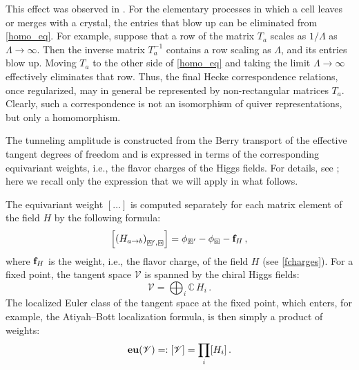 \documentclass[10pt]{article}
\theoremstyle{definition}
\def\IC{\mathbb{C}}
\def\sV{{\mathscr{V}}}
\def\lm{\limits}
\numberwithin{equation}{section}
\newcommand\ssqbox[1]{{
		\setbox0=\hbox{\mbox{$\scriptstyle\Box$}}
		\setbox1=\hbox{\mbox{\raisebox{0.35ex}{\tiny #1}}}
		\mbox{\raisebox{-0.2ex}{\rlap{\hbox to \wd0{\hss{\box1}\hss}}\box0}}
}}
\begin{document}
This effect was observed in \cite{Galakhov:2020vyb}.
For the elementary processes in which a cell leaves or merges with a crystal, the entries that blow up can be eliminated from \eqref{homo_eq}.
For example, suppose that a row of the matrix $T_a$ scales as $1/\Lambda$ as $\Lambda\to\infty$.
Then the inverse matrix $T_a^{-1}$ contains a row scaling as $\Lambda$, and its entries blow up.
Moving $T_a$ to the other side of \eqref{homo_eq} and taking the limit $\Lambda\to\infty$ effectively eliminates that row.
Thus, the final Hecke correspondence relations, once regularized, may in general be represented by non-rectangular matrices $T_a$.
Clearly, such a correspondence is not an isomorphism of quiver representations, but only a homomorphism.

The tunneling amplitude is constructed from the Berry transport of the effective tangent degrees of freedom and is expressed in terms of the corresponding equivariant weights, i.e., the flavor charges of the Higgs fields.
For details, see \cite{Galakhov:2020vyb,Galakhov:2024bzs,Galakhov:2025fhd}; here we recall only the expression that we will apply in what follows.

The equivariant weight $[\ldots]$ is computed separately for each matrix element of the field $H$ by the following formula:
\begin{equation}
	\left[\left(H_{a\to b}\right)_{\ssqbox{$b$}',\ssqbox{$a$}}\right]=\phi_{\ssqbox{$b$}'}-\phi_{\ssqbox{$a$}}-{\bf f}_H\,,
\end{equation}
where ${\bf f}_H$ is the weight, i.e., the flavor charge, of the field $H$ (see \eqref{fcharges}).
For a fixed point, the tangent space $\sV$ is spanned by the chiral Higgs fields:
\begin{equation}
	\sV=\bigoplus_i \IC\,H_i\,.
\end{equation}
The localized Euler class of the tangent space at the fixed point, which enters, for example, the Atiyah--Bott localization formula, is then simply a product of weights:
\begin{equation}
	{\bf eu}(\sV)=:[\sV]=\prod\lm_{i}[H_i]\,.
\end{equation}
\end{document}
